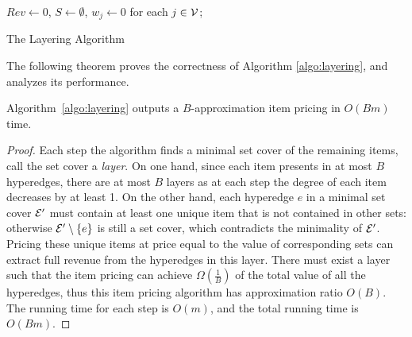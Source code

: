 \begin{algorithm}[!htp]
	\DontPrintSemicolon 
	\BlankLine
	$Rev \leftarrow 0$, $S\leftarrow \emptyset$, $w_j \leftarrow 0$ for each $j \in \mathcal{V}$;\\
	\caption{The Layering Algorithm}
	\label{algo:layering}
\end{algorithm}

The following theorem proves the correctness of Algorithm \ref{algo:layering}, and analyzes its performance.

\begin{theorem}
\label{thm-Bapprox}

Algorithm~\ref{algo:layering} outputs a $B$-approximation item pricing in $O(Bm)$ time. 

\end{theorem}

\begin{proof}
Each step the algorithm finds a minimal set cover of the remaining items, call the set cover a \textit{layer}.
On one hand, since each item presents in at most $B$ hyperedges, there are at most $B$ layers as at each step the degree of each item decreases by at least 1. On the other hand, each hyperedge $e$ in a minimal
set cover $\mathcal{E}'$ must contain at least one unique item that is not contained in other sets: otherwise $\mathcal{E}'\setminus \{e\}$ is still a set cover,
which contradicts the minimality of $\mathcal{E}'$. Pricing these unique items at price equal to the value of corresponding sets can extract full revenue from the hyperedges in this layer. There must exist a layer such that the item pricing can achieve 
$\Omega(\frac{1}{B})$ of the total value of all the hyperedges, thus this item pricing algorithm has approximation ratio $O(B)$. The running time for each step is $O(m)$, and the total running time is $O(Bm)$.
\end{proof}
